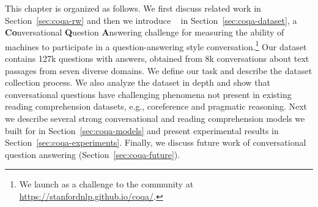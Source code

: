 This chapter is organized as follows. We first discuss related work in Section~\ref{sec:coqa-rw} and then we introduce ~\cite{reddy2019coqa} in Section~\ref{sec:coqa-dataset}, a \textbf{Co}nversational \textbf{Q}uestion \textbf{A}nswering challenge for measuring the ability of machines to participate in a question-answering style conversation.\footnote{We launch  as a challenge to the community at \href{https://stanfordnlp.github.io/coqa/}{https://stanfordnlp.github.io/coqa/}.} Our dataset contains 127k questions with answers, obtained from 8k conversations about text passages from seven diverse domains. We define our task and describe the dataset collection process. We also analyze the dataset in depth and show that conversational questions have challenging phenomena not present in existing reading comprehension datasets, e.g., coreference and pragmatic reasoning. Next we describe several strong conversational and reading comprehension models we built for  in Section~\ref{sec:coqa-models} and present experimental results in Section~\ref{sec:coqa-experiments}. Finally, we discuss future work of conversational question answering (Section~\ref{sec:coqa-future}).
